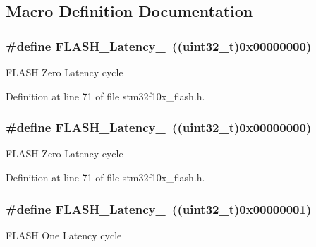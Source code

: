 \subsection{Macro Definition Documentation}
\subsubsection[{\texorpdfstring{F\+L\+A\+S\+H\+\_\+\+Latency\+\_\+0}{FLASH_Latency_0}}]{\setlength{\rightskip}{0pt plus 5cm}\#define F\+L\+A\+S\+H\+\_\+\+Latency\+\_~(({\bf uint32\+\_\+t})0x00000000)}\hypertarget{group___flash___latency_ga09afe6e52b819cc074f6111ec42ac3c3}{}\label{group___flash___latency_ga09afe6e52b819cc074f6111ec42ac3c3}
F\+L\+A\+SH Zero Latency cycle 

Definition at line 71 of file stm32f10x\+\_\+flash.\+h.

\subsubsection[{\texorpdfstring{F\+L\+A\+S\+H\+\_\+\+Latency\+\_\+0}{FLASH_Latency_0}}]{\setlength{\rightskip}{0pt plus 5cm}\#define F\+L\+A\+S\+H\+\_\+\+Latency\+\_~(({\bf uint32\+\_\+t})0x00000000)}\hypertarget{group___flash___latency_ga09afe6e52b819cc074f6111ec42ac3c3}{}\label{group___flash___latency_ga09afe6e52b819cc074f6111ec42ac3c3}
F\+L\+A\+SH Zero Latency cycle 

Definition at line 71 of file stm32f10x\+\_\+flash.\+h.

\subsubsection[{\texorpdfstring{F\+L\+A\+S\+H\+\_\+\+Latency\+\_\+1}{FLASH_Latency_1}}]{\setlength{\rightskip}{0pt plus 5cm}\#define F\+L\+A\+S\+H\+\_\+\+Latency\+\_~(({\bf uint32\+\_\+t})0x00000001)}\hypertarget{group___flash___latency_ga6b7281665340fe8f7919bdfcfd06f8e6}{}\label{group___flash___latency_ga6b7281665340fe8f7919bdfcfd06f8e6}
F\+L\+A\+SH One Latency cycle 

